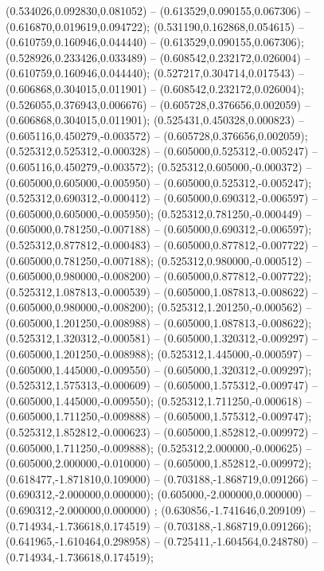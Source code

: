  (0.534026,0.092830,0.081052) -- (0.613529,0.090155,0.067306) -- (0.616870,0.019619,0.094722);
 (0.531190,0.162868,0.054615) -- (0.610759,0.160946,0.044440) -- (0.613529,0.090155,0.067306);
 (0.528926,0.233426,0.033489) -- (0.608542,0.232172,0.026004) -- (0.610759,0.160946,0.044440);
 (0.527217,0.304714,0.017543) -- (0.606868,0.304015,0.011901) -- (0.608542,0.232172,0.026004);
 (0.526055,0.376943,0.006676) -- (0.605728,0.376656,0.002059) -- (0.606868,0.304015,0.011901);
 (0.525431,0.450328,0.000823) -- (0.605116,0.450279,-0.003572) -- (0.605728,0.376656,0.002059);
 (0.525312,0.525312,-0.000328) -- (0.605000,0.525312,-0.005247) -- (0.605116,0.450279,-0.003572);
 (0.525312,0.605000,-0.000372) -- (0.605000,0.605000,-0.005950) -- (0.605000,0.525312,-0.005247);
 (0.525312,0.690312,-0.000412) -- (0.605000,0.690312,-0.006597) -- (0.605000,0.605000,-0.005950);
 (0.525312,0.781250,-0.000449) -- (0.605000,0.781250,-0.007188) -- (0.605000,0.690312,-0.006597);
 (0.525312,0.877812,-0.000483) -- (0.605000,0.877812,-0.007722) -- (0.605000,0.781250,-0.007188);
 (0.525312,0.980000,-0.000512) -- (0.605000,0.980000,-0.008200) -- (0.605000,0.877812,-0.007722);
 (0.525312,1.087813,-0.000539) -- (0.605000,1.087813,-0.008622) -- (0.605000,0.980000,-0.008200);
 (0.525312,1.201250,-0.000562) -- (0.605000,1.201250,-0.008988) -- (0.605000,1.087813,-0.008622);
 (0.525312,1.320312,-0.000581) -- (0.605000,1.320312,-0.009297) -- (0.605000,1.201250,-0.008988);
 (0.525312,1.445000,-0.000597) -- (0.605000,1.445000,-0.009550) -- (0.605000,1.320312,-0.009297);
 (0.525312,1.575313,-0.000609) -- (0.605000,1.575312,-0.009747) -- (0.605000,1.445000,-0.009550);
 (0.525312,1.711250,-0.000618) -- (0.605000,1.711250,-0.009888) -- (0.605000,1.575312,-0.009747);
 (0.525312,1.852812,-0.000623) -- (0.605000,1.852812,-0.009972) -- (0.605000,1.711250,-0.009888);
 (0.525312,2.000000,-0.000625) -- (0.605000,2.000000,-0.010000) -- (0.605000,1.852812,-0.009972);
 (0.618477,-1.871810,0.109000) -- (0.703188,-1.868719,0.091266) -- (0.690312,-2.000000,0.000000);
 (0.605000,-2.000000,0.000000) -- (0.690312,-2.000000,0.000000) ;
 (0.630856,-1.741646,0.209109) -- (0.714934,-1.736618,0.174519) -- (0.703188,-1.868719,0.091266);
 (0.641965,-1.610464,0.298958) -- (0.725411,-1.604564,0.248780) -- (0.714934,-1.736618,0.174519);
